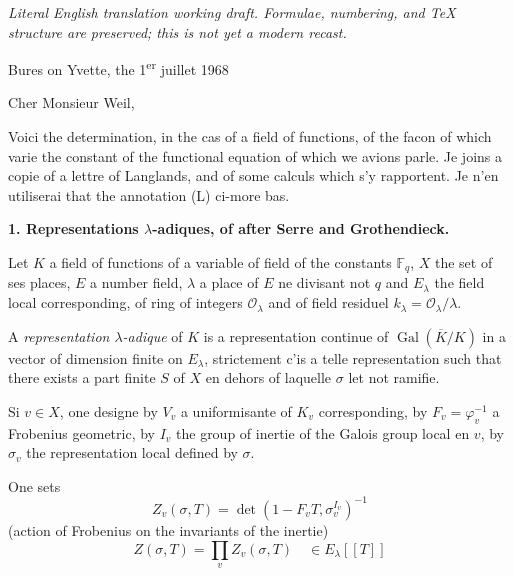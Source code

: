 \documentclass[11pt,a4paper]{article}
\theoremstyle{plain}
\DeclareMathOperator{\Gal}{Gal}
\begin{document}
\begin{center}\small\emph{Literal English translation working draft. Formulae, numbering, and TeX structure are preserved; this is not yet a modern recast.}\end{center}
\vspace{0.5em}


\begin{flushright}
Bures on Yvette, the 1\textsuperscript{er} juillet 1968
\end{flushright}

\vspace{0.5cm}

Cher Monsieur Weil,

\vspace{0.3cm}

Voici the determination, in the cas of a field of functions, of the facon of which varie the constant of the functional equation of which we avions parle. Je joins a copie of a lettre of Langlands, and of some calculs which s'y rapportent. Je n'en utiliserai that the annotation (L) ci-more bas.

\vspace{0.5cm}

\noindent\textbf{1. Representations $\lambda$-adiques, of after Serre and Grothendieck.}

\vspace{0.3cm}

Let $K$ a field of functions of a variable of field of the constants $\mathbb{F}_q$, $X$ the set of ses places, $E$ a number field, $\lambda$ a place of $E$ ne divisant not $q$ and $E_\lambda$ the field local corresponding, of ring of integers $\mathcal{O}_\lambda$ and of field residuel $k_\lambda = \mathcal{O}_\lambda/\lambda$.

A \emph{representation $\lambda$-adique} of $K$ is a representation continue of $\Gal(\overline{K}/K)$ in a vector of dimension finite on $E_\lambda$, strictement c'is a telle representation such that there exists a part finite $S$ of $X$ en dehors of laquelle $\sigma$ let not ramifie.

Si $v \in X$, one designe by $V_v$ a uniformisante of $K_v$ corresponding, by $F_v = \varphi_v^{-1}$ a Frobenius geometric, by $I_v$ the group of inertie of the Galois group local en $v$, by $\sigma_v$ the representation local defined by $\sigma$.

\vspace{0.5cm}

One sets
\[
Z_v(\sigma, T) = \det(1 - F_v T, \sigma_v^{I_v})^{-1}
\]
(action of Frobenius on the invariants of the inertie)
\[
Z(\sigma, T) = \prod_v Z_v(\sigma, T) \quad \in E_\lambda[[T]]
\]
\end{document}
